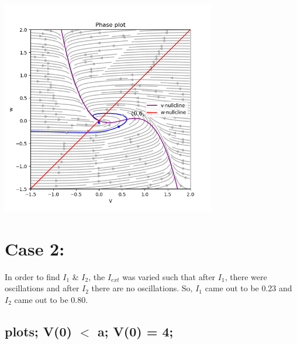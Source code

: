 \documentclass[a4paper, 12pt]{article}
\begin{document}
\begin{minipage}{\linewidth}
    \centering
    \includegraphics[width=0.7\textwidth]{Q1_b_ii_3}
    \label{fig:Q2_b_i_3}
\end{minipage}

\section{Case 2: }
\label{case_2}

In order to find $ I_1 $ \& $ I_2 $, the $ I_{ext} $ was varied such that after $ I_1 $, there were oscillations and after $ I_2 $ there are no oscillations. So, $ I_1 $ came out to be 0.23 and $ I_2 $ came out to be 0.80.

\subsection{ plots; V(0) $ < $ a; V(0) = 4;}
\end{document}
